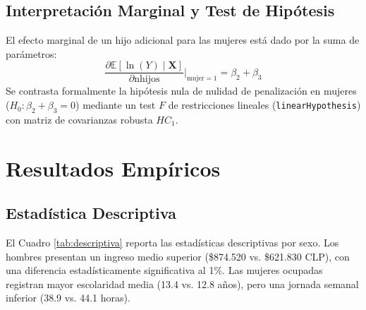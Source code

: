\documentclass[11pt,a4paper]{article}
\begin{document}
\subsection{Interpretación Marginal y Test de Hipótesis}
El efecto marginal de un hijo adicional para las mujeres está dado por la suma de parámetros:
\begin{equation}
    \frac{\partial \mathbb{E}[\ln(Y) \mid \mathbf{X}]}{\partial \text{nhijos}} \Bigg|_{\text{mujer}=1} = \beta_2 + \beta_3
\end{equation}
Se contrasta formalmente la hipótesis nula de nulidad de penalización en mujeres ($H_0: \beta_2 + \beta_3 = 0$) mediante un test $F$ de restricciones lineales (\texttt{linearHypothesis}) con matriz de covarianzas robusta $HC_1$.

\section{Resultados Empíricos}

\subsection{Estadística Descriptiva}
El Cuadro \ref{tab:descriptiva} reporta las estadísticas descriptivas por sexo. Los hombres presentan un ingreso medio superior (\$874.520 vs. \$621.830 CLP), con una diferencia estadísticamente significativa al 1\%. Las mujeres ocupadas registran mayor escolaridad media (13.4 vs. 12.8 años), pero una jornada semanal inferior (38.9 vs. 44.1 horas).
\end{document}
